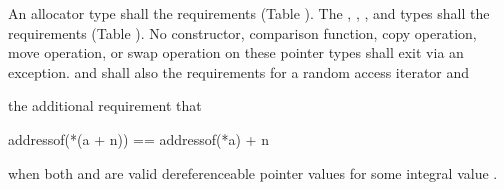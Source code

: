 \setcounter{Paras}{4}
\pnum
An allocator type  shall  the
 requirements (Table ).
The , , , and
 types shall  the
 requirements (Table ).
No constructor,
comparison function, copy operation, move operation, or swap operation on
these pointer types shall exit via an exception.  and  shall also
 the requirements for
a random access iterator and 
\begin{addedblock}
the additional requirement that
\begin{codeblock}
addressof(*(a + n)) == addressof(*a) + n
\end{codeblock}
when both  and  are valid dereferenceable
pointer values for some integral value .
\end{addedblock}
